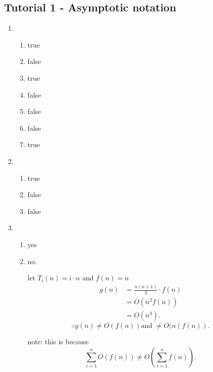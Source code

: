 \documentclass[../../main/main.tex]{subfiles}
\begin{document}
\subsection{Tutorial 1 - Asymptotic notation}
\begin{enumerate}
	\item \begin{enumerate}
		      \item  true
		      \item false
		      \item true
		      \item false
		      \item false
		      \item false
		      \item true
	      \end{enumerate}
	\item \begin{enumerate}
		      \item true
		      \item false
		      \item false
	      \end{enumerate}
	\item \begin{enumerate}
		      \item yes
		      \item no.

                let $T_{i}(n) = i \cdot n$ and $f(n) = n$
		            \begin{align*}
			            g(n) & = \frac{n(n+1)}{2} \cdot f(n) \\
			                 & = O(n^2f(n)) \\
                       & = O(n^3)
			            .\end{align*}
                  \[
                    \therefore g(n) \neq O(f(n)) \text{and }\neq O(n(f(n))
                  .\] 

                note: this is because
                \[
                \sum^{n}_{i=1}  O(f(n)) \neq  O(\sum^{n}_{i=1} f(n))
                .\] 
	      \end{enumerate}
\end{enumerate}
\end{document}
